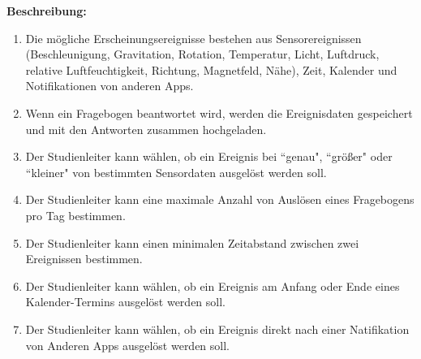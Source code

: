 \documentclass[a4paper]{scrreprt}
\begin{document}
\begin{itemize}
                \par \textbf{Beschreibung: }
                    \begin{enumerate}
                        \item Die mögliche Erscheinungsereignisse bestehen aus Sensorereignissen (Beschleunigung, Gravitation, Rotation, Temperatur, Licht, Luftdruck, relative Luftfeuchtigkeit, Richtung, Magnetfeld, Nähe), Zeit, Kalender und Notifikationen von anderen Apps.
                        \item Wenn ein Fragebogen beantwortet wird, werden die Ereignisdaten gespeichert und mit den Antworten zusammen hochgeladen.
                        \item Der \gls{Studienleiter} kann wählen, ob ein Ereignis bei ``genau", ``größer" oder ``kleiner" von bestimmten Sensordaten ausgelöst werden soll.
                        \item Der \gls{Studienleiter} kann eine maximale Anzahl von Auslösen eines Fragebogens pro Tag bestimmen.
                        \item Der \gls{Studienleiter} kann einen minimalen Zeitabstand zwischen zwei Ereignissen bestimmen.
                        \item  Der \gls{Studienleiter} kann wählen, ob ein Ereignis am Anfang oder Ende eines Kalender-Termins ausgelöst werden soll.
                        \item  Der \gls{Studienleiter} kann wählen, ob ein Ereignis direkt nach einer Natifikation von Anderen Apps ausgelöst werden soll.
                    \end{enumerate}



\end{itemize}
\end{document}

